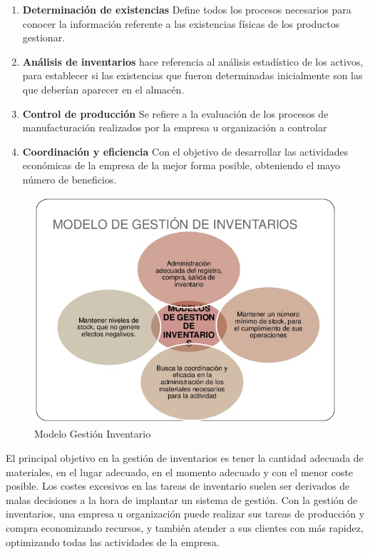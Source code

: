 \documentclass[a4paper,11pt]{book}
\begin{document}
\begin{enumerate}
\item \textbf{Determinación de existencias} Define todos los procesos necesarios para conocer la información referente a las existencias físicas de los productos gestionar.
\item \textbf{Análisis de inventarios} hace referencia al análisis estadístico de los activos, para establecer si las existencias que fueron determinadas inicialmente son las que deberían aparecer en el almacén.  
\item \textbf{Control de producción} Se refiere a la evaluación de los procesos de manufacturación realizados por la empresa u organización a controlar
\item \textbf{Coordinación y eficiencia} Con el objetivo de desarrollar las actividades económicas de la empresa de la mejor forma posible, obteniendo el mayo número de beneficios. 
\end{enumerate}
 
 
\begin{figure}[H]  
\centering 
\includegraphics[scale=0.7]{imagenes/intro/modelo.jpg}
\caption{ Modelo Gestión Inventario\cite{modelo} }  
\end{figure} 

El principal objetivo en la gestión de inventarios es tener la cantidad adecuada de materiales, en el lugar adecuado, en el momento adecuado y con el menor coste posible. Los costes excesivos en las tareas de inventario suelen ser derivados de malas decisiones a la hora de implantar un sistema de gestión.  Con la gestión de inventarios, una empresa u organización puede realizar sus tareas de producción y compra economizando recursos, y también atender a sus clientes con más rapidez, optimizando todas las actividades de la empresa.
\end{document}
